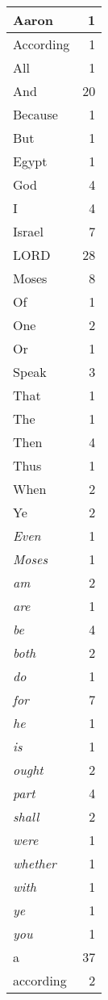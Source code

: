 \begin{center}
\begin{longtable}{l|r}
\hline \hline
\endlastfoot
Aaron & 1 \\ \hline
According & 1 \\ \hline
All & 1 \\ \hline
And & 20 \\ \hline
Because & 1 \\ \hline
But & 1 \\ \hline
Egypt & 1 \\ \hline
God & 4 \\ \hline
I & 4 \\ \hline
Israel & 7 \\ \hline
LORD & 28 \\ \hline
Moses & 8 \\ \hline
Of & 1 \\ \hline
One & 2 \\ \hline
Or & 1 \\ \hline
Speak & 3 \\ \hline
That & 1 \\ \hline
The & 1 \\ \hline
Then & 4 \\ \hline
Thus & 1 \\ \hline
When & 2 \\ \hline
Ye & 2 \\ \hline
\emph{Even} & 1 \\ \hline
\emph{Moses} & 1 \\ \hline
\emph{am} & 2 \\ \hline
\emph{are} & 1 \\ \hline
\emph{be} & 4 \\ \hline
\emph{both} & 2 \\ \hline
\emph{do} & 1 \\ \hline
\emph{for} & 7 \\ \hline
\emph{he} & 1 \\ \hline
\emph{is} & 1 \\ \hline
\emph{ought} & 2 \\ \hline
\emph{part} & 4 \\ \hline
\emph{shall} & 2 \\ \hline
\emph{were} & 1 \\ \hline
\emph{whether} & 1 \\ \hline
\emph{with} & 1 \\ \hline
\emph{ye} & 1 \\ \hline
\emph{you} & 1 \\ \hline
a & 37 \\ \hline
according & 2 \\ \hline

\end{longtable}
\end{center}
